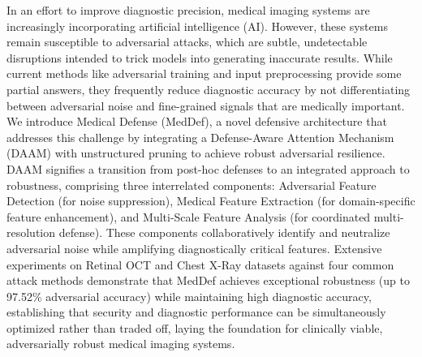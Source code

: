 
In an effort to improve diagnostic precision, medical imaging systems are increasingly incorporating artificial intelligence (AI). However, these systems remain susceptible to adversarial attacks, which are subtle, undetectable disruptions intended to trick models into generating inaccurate results. While current methods like adversarial training and input preprocessing provide some partial answers, they frequently reduce diagnostic accuracy by not differentiating between adversarial noise and fine-grained signals that are medically important. We introduce Medical Defense (MedDef), a novel defensive architecture that addresses this challenge by integrating a Defense-Aware Attention Mechanism (DAAM) with unstructured pruning to achieve robust adversarial resilience. DAAM signifies a transition from post-hoc defenses to an integrated approach to robustness, comprising three interrelated components: Adversarial Feature Detection (for noise suppression), Medical Feature Extraction (for domain-specific feature enhancement), and Multi-Scale Feature Analysis (for coordinated multi-resolution defense). These components collaboratively identify and neutralize adversarial noise while amplifying diagnostically critical features. Extensive experiments on Retinal OCT and Chest X-Ray datasets against four common attack methods demonstrate that MedDef achieves exceptional robustness (up to 97.52\% adversarial accuracy) while maintaining high diagnostic accuracy, establishing that security and diagnostic performance can be simultaneously optimized rather than traded off, laying the foundation for clinically viable, adversarially robust medical imaging systems.